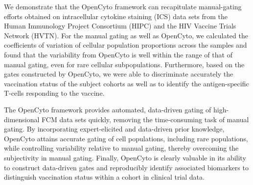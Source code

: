 \documentclass[12pt]{article}
\begin{document}
We demonstrate that the OpenCyto framework can recapitulate manual-gating efforts obtained on intracellular cytokine staining (ICS) data sets from the Human Immunology Project Consortium (HIPC) and the HIV Vaccine Trials Network (HVTN). For the manual gating as well as OpenCyto, we calculated the coefficients of variation of cellular population proportions across the samples and found that the variability from OpenCyto is well within the range of that of manual gating, even for rare cellular subpopulations. Furthermore, based on the gates constructed by OpenCyto, we were able to discriminate accurately the vaccination status of the subject cohorts as well as to identify the antigen-specific T-cells responding to the vaccine.

The OpenCyto framework provides automated, data-driven gating of high-dimensional FCM data sets quickly, removing the time-consuming task of manual gating. By incorporating expert-elicited and data-driven prior knowledge, OpenCyto attains accurate gating of cell populations, including rare populations, while controlling variability relative to manual gating, thereby overcoming the subjectivity in manual gating. Finally, OpenCyto is clearly valuable in its ability to construct data-driven gates and reproducibly identify associated biomarkers to distinguish vaccination status within a cohort in clinical trial data.
\end{document}
